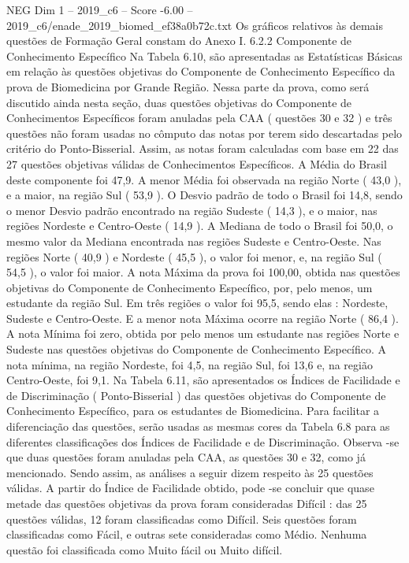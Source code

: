 \begin{textsample}{NEG Dim 1 – 2019\_c6 – Score -6.00 – 2019\_c6/enade\_2019\_biomed\_ef38a0b72c.txt}
Os gráficos relativos às demais questões de Formação Geral constam do Anexo I. 6.2.2 Componente de Conhecimento Específico Na Tabela 6.10, são apresentadas as Estatísticas Básicas em relação às questões objetivas do Componente de Conhecimento Específico da prova de Biomedicina por Grande Região.
Nessa parte da prova, como será discutido ainda nesta seção, duas questões objetivas do Componente de Conhecimentos Específicos foram anuladas pela CAA ( questões 30 e 32 ) e três questões não foram usadas no cômputo das notas por terem sido descartadas pelo critério do Ponto-Bisserial.
Assim, as notas foram calculadas com base em 22 das 27 questões objetivas válidas de Conhecimentos Específicos.
A Média do Brasil deste componente foi 47,9.
A menor Média foi observada na região Norte ( 43,0 ), e a maior, na região Sul ( 53,9 ).
O Desvio padrão de todo o Brasil foi 14,8, sendo o menor Desvio padrão encontrado na região Sudeste ( 14,3 ), e o maior, nas regiões Nordeste e Centro-Oeste ( 14,9 ).
A Mediana de todo o Brasil foi 50,0, o mesmo valor da Mediana encontrada nas regiões Sudeste e Centro-Oeste.
Nas regiões Norte ( 40,9 ) e Nordeste ( 45,5 ), o valor foi menor, e, na região Sul ( 54,5 ), o valor foi maior.
A nota Máxima da prova foi 100,00, obtida nas questões objetivas do Componente de Conhecimento Específico, por, pelo menos, um estudante da região Sul.
Em três regiões o valor foi 95,5, sendo elas : Nordeste, Sudeste e Centro-Oeste.
E a menor nota Máxima ocorre na região Norte ( 86,4 ).
A nota Mínima foi zero, obtida por pelo menos um estudante nas regiões Norte e Sudeste nas questões objetivas do Componente de Conhecimento Específico.
A nota mínima, na região Nordeste, foi 4,5, na região Sul, foi 13,6 e, na região Centro-Oeste, foi 9,1.
Na Tabela 6.11, são apresentados os Índices de Facilidade e de Discriminação ( Ponto-Bisserial ) das questões objetivas do Componente de Conhecimento Específico, para os estudantes de Biomedicina.
Para facilitar a diferenciação das questões, serão usadas as mesmas cores da Tabela 6.8 para as diferentes classificações dos Índices de Facilidade e de Discriminação.
Observa -se que duas questões foram anuladas pela CAA, as questões 30 e 32, como já mencionado.
Sendo assim, as análises a seguir dizem respeito às 25 questões válidas.
A partir do Índice de Facilidade obtido, pode -se concluir que quase metade das questões objetivas da prova foram consideradas Difícil : das 25 questões válidas, 12 foram classificadas como Difícil.
Seis questões foram classificadas como Fácil, e outras sete consideradas como Médio.
Nenhuma questão foi classificada como Muito fácil ou Muito difícil.

\end{textsample}
